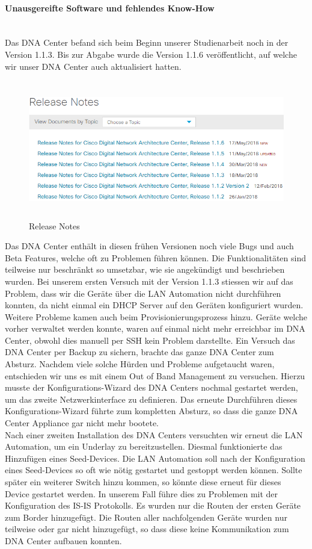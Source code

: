 \paragraph{Unausgereifte Software und fehlendes Know-How}
~\\
Das DNA Center befand sich beim Beginn unserer Studienarbeit noch in der Version 1.1.3. Bis zur Abgabe wurde die Version 1.1.6 veröffentlicht, auf welche wir unser DNA Center auch aktualisiert hatten. 
\begin{figure}[H]
	\centering
	\includegraphics[height=6cm]{img/ReleaseNotes.png}
	\caption{Release Notes}
	\label{fig:Release Notes}
\end{figure}
Das DNA Center enthält in diesen frühen Versionen noch viele Bugs und auch Beta Features, welche oft zu Problemen führen können. Die Funktionalitäten sind teilweise nur beschränkt so umsetzbar, wie sie angekündigt und beschrieben wurden. 
Bei unserem ersten Versuch mit der Version 1.1.3 stiessen wir auf das Problem, dass wir die Geräte über die LAN Automation nicht durchführen konnten, da nicht einmal ein DHCP Server auf den Geräten konfiguriert wurden. Weitere Probleme kamen auch beim Provisionierungsprozess hinzu. Geräte welche vorher verwaltet werden konnte, waren auf einmal nicht mehr erreichbar im DNA Center, obwohl dies manuell per SSH kein Problem darstellte. Ein Versuch das DNA Center per Backup zu sichern, brachte das ganze DNA Center zum Absturz. Nachdem viele solche Hürden und Probleme aufgetaucht waren, entschieden wir uns es mit einem Out of Band Management zu versuchen. Hierzu musste der Konfigurations-Wizard des DNA Centers nochmal gestartet werden, um das zweite Netzwerkinterface zu definieren. Das erneute Durchführen dieses Konfigurations-Wizard führte zum kompletten Absturz, so dass die ganze DNA Center Appliance gar nicht mehr bootete. \\
Nach einer zweiten Installation des DNA Centers versuchten wir erneut die LAN Automation, um ein Underlay zu bereitzustellen. Diesmal funktionierte das Hinzufügen eines Seed-Devices. Die LAN Automation soll nach der Konfiguration eines Seed-Devices so oft wie nötig gestartet und gestoppt werden können. Sollte später ein weiterer Switch hinzu kommen, so könnte diese erneut für dieses Device gestartet werden. In unserem Fall führe dies zu Problemen mit der Konfiguration des IS-IS Protokolls. Es wurden nur die Routen der ersten Geräte zum Border hinzugefügt. Die Routen aller nachfolgenden Geräte wurden nur teilweise oder gar nicht hinzugefügt, so dass diese keine Kommunikation zum DNA Center aufbauen konnten. 
